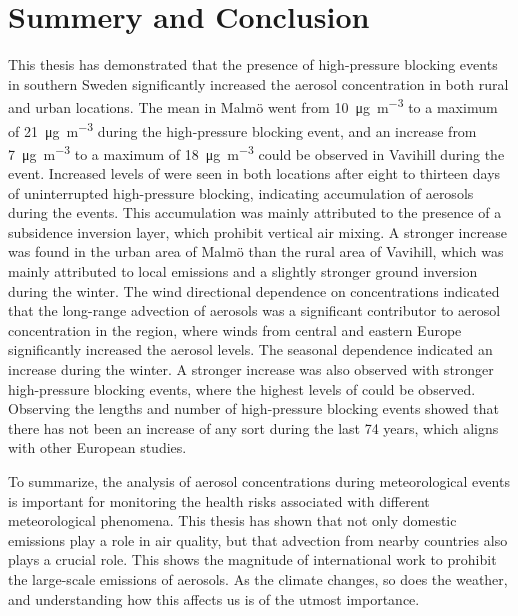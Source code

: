 \section{Summery and Conclusion}
This thesis has demonstrated that the presence of high-pressure blocking events in southern Sweden significantly increased the aerosol concentration in both rural and urban locations. The mean \PM in Malmö went from \SI{10}{\micro\gram\per\meter\cubed} to a maximum of \SI{21}{\micro\gram\per\meter\cubed} during the high-pressure blocking event, and an increase from \SI{7}{\micro\gram\per\meter\cubed} to a maximum of \SI{18}{\micro\gram\per\meter\cubed} could be observed in Vavihill during the event. Increased levels of \PM were seen in both locations after eight to thirteen days of uninterrupted high-pressure blocking, indicating accumulation of aerosols during the events. This accumulation was mainly attributed to the presence of a subsidence inversion layer, which prohibit vertical air mixing. A stronger increase was found in the urban area of Malmö than the rural area of Vavihill, which was mainly attributed to local emissions and a slightly stronger ground inversion during the winter. The wind directional dependence on \PM concentrations indicated that the long-range advection of aerosols was a significant contributor to aerosol concentration in the region, where winds from central and eastern Europe significantly increased the aerosol levels. The seasonal dependence indicated an increase during the winter. A stronger increase was also observed with stronger high-pressure blocking events, where the highest levels of \PM could be observed. Observing the lengths and number of high-pressure blocking events showed that there has not been an increase of any sort during the last 74 years, which aligns with other European studies.

To summarize, the analysis of aerosol concentrations during meteorological events is important for monitoring the health risks associated with different meteorological phenomena. This thesis has shown that not only domestic emissions play a role in air quality, but that advection from nearby countries also plays a crucial role. This shows the magnitude of international work to prohibit the large-scale emissions of aerosols. As the climate changes, so does the weather, and understanding how this affects us is of the utmost importance.

